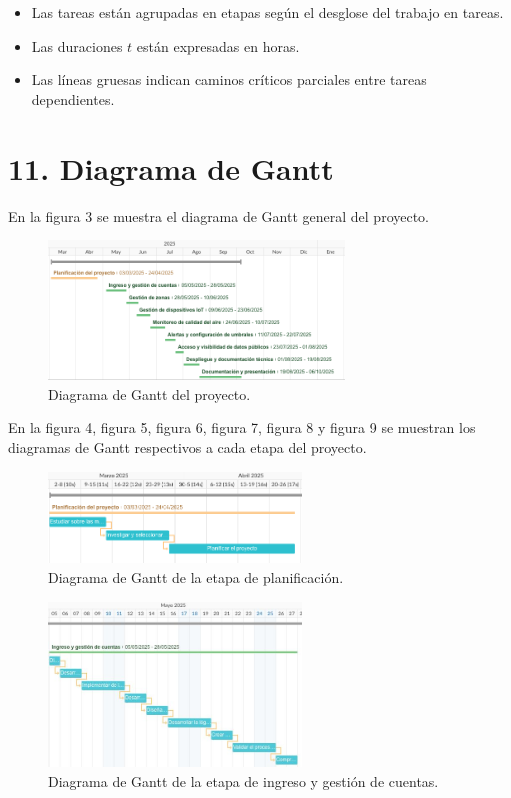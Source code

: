 \documentclass[
11pt, %
]{charter}
\begin{document}
\begin{itemize}
    \item Las tareas están agrupadas en etapas según el desglose del trabajo en tareas.
    \item Las duraciones $t$ están expresadas en horas.
    \item Las líneas gruesas indican caminos críticos parciales entre tareas dependientes.
\end{itemize}


\section{11. Diagrama de Gantt}
\label{sec:gantt}

En la figura 3 se muestra el diagrama de Gantt general del proyecto.

\begin{figure}[htpb]
\centering 
\includegraphics[width=0.7\textwidth]{./Figuras/fig_3-1-Gantt.png}
\caption{Diagrama de Gantt del proyecto.}
\label{fig:AoN}
\end{figure}

En la figura 4, figura 5, figura 6, figura 7, figura 8 y figura 9 se muestran los diagramas de Gantt respectivos a cada etapa del proyecto.

\begin{figure}[htpb]
\centering 
\includegraphics[width=0.6\textwidth]{./Figuras/fig_4-1-Gantt.png}
\caption{Diagrama de Gantt de la etapa de planificación.}
\label{fig:AoN}
\end{figure}



\begin{figure}[htpb]
\centering 
\includegraphics[width=0.6\textwidth]{./Figuras/fig_5-1-Gantt.jpeg}
\caption{Diagrama de Gantt de la etapa de ingreso y gestión de cuentas.}
\label{fig:AoN}
\end{figure}
\end{document}
